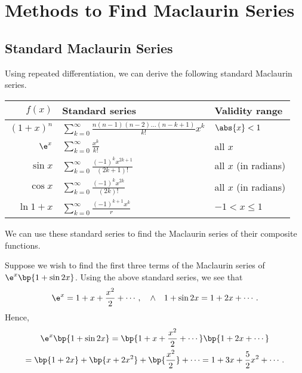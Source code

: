 \section{Methods to Find Maclaurin Series}

\subsection{Standard Maclaurin Series}

Using repeated differentiation, we can derive the following standard Maclaurin series.

\begin{table}[H]
    \centering
    \begin{tabular}{|rll|}
    \hline
    $f(x)$ & \textbf{Standard series} & \textbf{Validity range} \\ \hline\hline
    $(1+x)^n$ & $\displaystyle\sum_{k = 0}^\infty \frac{n(n-1)(n-2)\dots(n-k+1)}{k!} x^k$ & $\abs{x} < 1$ \\
    $\e^x$ & $\displaystyle \sum_{k = 0}^\infty \frac{x^k}{k!}$ & all $x$ \\
    $\sin x$ & $\displaystyle \sum_{k = 0}^\infty \frac{(-1)^k x^{2k+1}}{(2k+1)!}$ & all $x$ (in radians) \\
    $\cos x$ & $\displaystyle \sum_{k = 0}^\infty \frac{(-1)^k x^{2k}}{(2k)!}$ & all $x$ (in radians) \\
    $\ln{1 + x}$ & $\displaystyle \sum_{k = 0}^\infty \frac{(-1)^{k + 1} x^k}{r}$ & $-1 < x \leq 1$ \\ \hline
    \end{tabular}
\end{table}

We can use these standard series to find the Maclaurin series of their composite functions.

\begin{example}
    Suppose we wish to find the first three terms of the Maclaurin series of $\e^x \bp{1 + \sin 2x}$. Using the above standard series, we see that \[\e^x = 1 + x + \frac{x^2}{2} + \cdots, \quad \land \quad 1 + \sin 2x = 1 + 2x + \cdots.\] Hence,
    \begin{gather*}
        \e^x \bp{1 + \sin 2x} = \bp{1 + x + \frac{x^2}{2} + \cdots}\bp{1 + 2x + \cdots}\\
        = \bp{1 + 2x} + \bp{x + 2x^2} + \bp{\frac{x^2}{2}} + \cdots = 1 + 3x + \frac52 x^2 + \cdots.
    \end{gather*}
\end{example}

